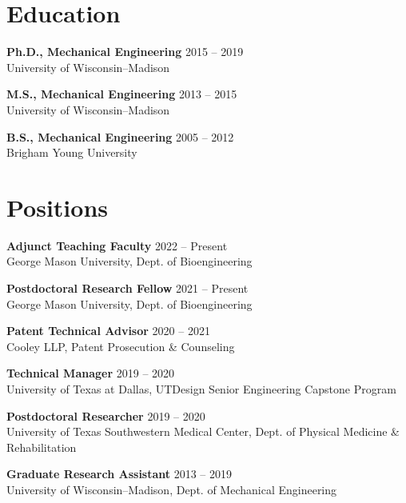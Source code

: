 \documentclass[letterpaper, 10pt]{article}
\begin{document}
\section{Education}

\textbf{Ph.D., Mechanical Engineering}
\hfill 2015 -- 2019\\ %
University of Wisconsin–Madison %
\medskip

\textbf{M.S., Mechanical Engineering}
\hfill 2013 -- 2015\\ %
University of Wisconsin–Madison %
\medskip

\textbf{B.S., Mechanical Engineering}
\hfill 2005 -- 2012\\ %
Brigham Young University %

\section{Positions}

\textbf{Adjunct Teaching Faculty}
\hfill 2022 -- Present\\ %
George Mason University, Dept. of Bioengineering
\medskip

\textbf{Postdoctoral Research Fellow}
\hfill 2021 -- Present\\ %
George Mason University, Dept. of Bioengineering
\medskip

\textbf{Patent Technical Advisor}
\hfill 2020 -- 2021\\ %
Cooley LLP, Patent Prosecution \& Counseling %
\medskip

\textbf{Technical Manager}
\hfill 2019 -- 2020\\ %
University of Texas at Dallas, UTDesign Senior Engineering Capstone Program %
\medskip

\textbf{Postdoctoral Researcher}
\hfill 2019 -- 2020\\ %
University of Texas Southwestern Medical Center, Dept. of Physical Medicine \& Rehabilitation %
\medskip

\textbf{Graduate Research Assistant}
\hfill 2013 -- 2019\\ %
University of Wisconsin–Madison, Dept. of Mechanical Engineering  %
\medskip
\end{document}
